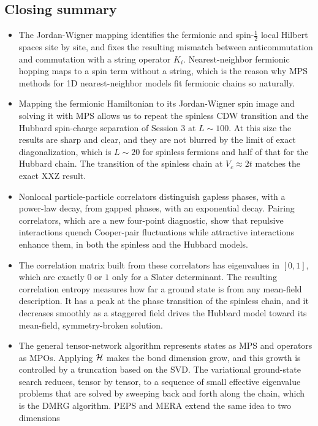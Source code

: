 \documentclass[lecture_notes.tex]{subfiles}
\begin{document}
\subsection*{Closing summary}
\begin{itemize}[nosep]
  \item The Jordan-Wigner mapping identifies the fermionic and spin-$\tfrac12$ local Hilbert spaces
    site by site, and fixes the resulting mismatch between anticommutation and commutation with a
    string operator $K_i$. Nearest-neighbor fermionic hopping maps to a spin term without a string,
    which is the reason why MPS methods for 1D nearest-neighbor models fit fermionic chains so
    naturally.
  \item Mapping the fermionic Hamiltonian to its Jordan-Wigner spin image and solving it with MPS
    allows us to repeat the spinless CDW transition and the Hubbard spin-charge separation of
    Session 3 at $L\sim100$. At this size the results are sharp and clear, and they are not blurred
    by the limit of exact diagonalization, which is $L\sim20$ for spinless fermions and half of that
    for the Hubbard chain. The transition of the spinless chain at $V_c\approx2t$ matches the exact
    XXZ result.
  \item Nonlocal particle-particle correlators distinguish gapless phases, with a power-law decay,
    from gapped phases, with an exponential decay. Pairing correlators, which are a new four-point
    diagnostic, show that repulsive interactions quench Cooper-pair fluctuations while attractive
    interactions enhance them, in both the spinless and the Hubbard models.
  \item The correlation matrix built from these correlators has eigenvalues in $[0,1]$, which are
    exactly $0$ or $1$ only for a Slater determinant. The resulting correlation entropy measures
    how far a ground state is from any mean-field description. It has a peak at the phase
    transition of the spinless chain, and it decreases smoothly as a staggered field drives the
    Hubbard model toward its mean-field, symmetry-broken solution.
  \item The general tensor-network algorithm represents states as MPS and operators as MPOs.
    Applying $\mathcal{H}$ makes the bond dimension grow, and this growth is controlled by a truncation
    based on the SVD. The variational ground-state search reduces, tensor by tensor, to a sequence
    of small effective eigenvalue problems that are solved by sweeping back and forth along the
    chain, which is the DMRG algorithm. PEPS and MERA extend the same idea to two dimensions

\end{itemize}
\end{document}
